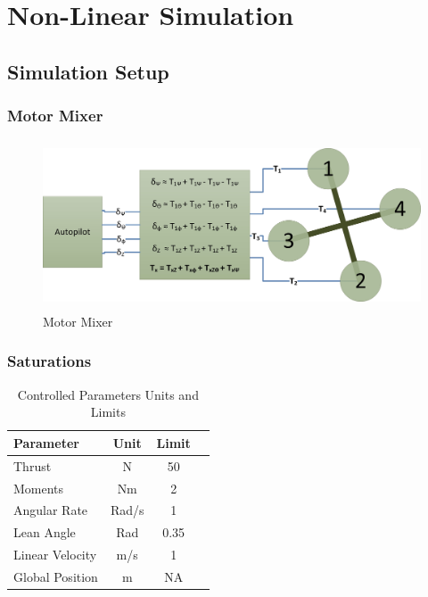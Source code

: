		\section{Non-Linear Simulation}\label{SECT_Nonlinear}
		\subsection{Simulation Setup}
		\subsubsection{Motor Mixer}		
		\begin{figure}[H]
			\centering
			\includegraphics[height = 5cm]{../References/Diagrams/MotorMixer.jpg}
			\caption{Motor Mixer}
			\label{IM_MotorMixer}
		\end{figure}	
		\subsubsection{Saturations}
		
		\begin{table}[!]
			\centering
			\begin{tabular}{l | c | c | c |}
				Parameter & Unit & Limit\\
				\hline\hline
				Thrust					& N 	& 50\\
				Moments					& Nm 	& 2\\
				Angular Rate 	   		& Rad/s & 1\\
				Lean Angle	    		& Rad 	& 0.35\\ %
				Linear Velocity 	  	& m/s 	& 1\\
				Global Position  		& m 	& NA\\
			\end{tabular}
			\label{tab:UnitsLimits}
			\caption{Controlled Parameters Units and Limits}
		\end{table}
		
